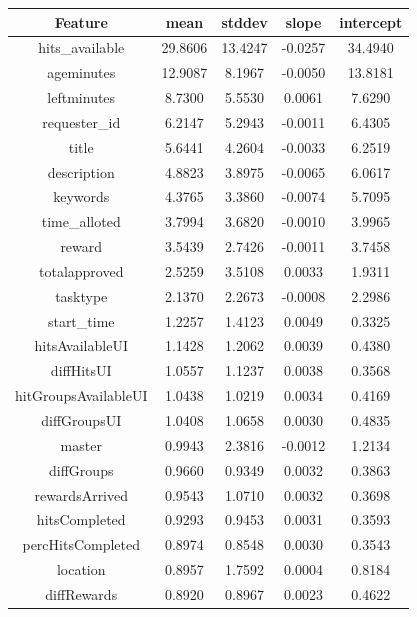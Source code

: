 \begin{table}[ht]
\scriptsize
\begin{tabular}{|c|c|c|c|c|}
\hline
Feature              & mean      & stddev    & slope     & intercept \\
\hline
hits\_available      & 29.8606 & 13.4247 & -0.0257 & 34.4940 \\
ageminutes           & 12.9087 &  8.1967 & -0.0050 & 13.8181 \\
leftminutes          &  8.7300 &  5.5530 & 0.0061 & 7.6290 \\
requester\_id        &  6.2147 &  5.2943 & -0.0011 & 6.4305 \\
title                &  5.6441 &  4.2604 & -0.0033 & 6.2519 \\
description          &  4.8823 &  3.8975 & -0.0065 & 6.0617 \\
keywords             &  4.3765 &  3.3860 & -0.0074 & 5.7095 \\
time\_alloted        &  3.7994 &  3.6820 & -0.0010 & 3.9965 \\
reward               &  3.5439 &  2.7426 & -0.0011 & 3.7458 \\
totalapproved        &  2.5259 &  3.5108 & 0.0033 & 1.9311 \\
tasktype             &  2.1370 &  2.2673 & -0.0008 & 2.2986 \\
start\_time          &  1.2257 &  1.4123 & 0.0049 & 0.3325 \\
hitsAvailableUI      &  1.1428 &  1.2062 & 0.0039 & 0.4380 \\
diffHitsUI           &  1.0557 &  1.1237 & 0.0038 & 0.3568 \\
hitGroupsAvailableUI &  1.0438 &  1.0219 & 0.0034 & 0.4169 \\
diffGroupsUI         &  1.0408 &  1.0658 & 0.0030 & 0.4835 \\
master               &  0.9943 &  2.3816 & -0.0012 & 1.2134 \\
diffGroups           &  0.9660 &  0.9349 & 0.0032 & 0.3863 \\
rewardsArrived       &  0.9543 &  1.0710 & 0.0032 & 0.3698 \\
hitsCompleted        &  0.9293 &  0.9453 & 0.0031 & 0.3593 \\
percHitsCompleted    &  0.8974 &  0.8548 & 0.0030 & 0.3543 \\
location             &  0.8957 &  1.7592 & 0.0004 & 0.8184 \\
diffRewards          &  0.8920 &  0.8967 & 0.0023 & 0.4622 \\

\end{tabular}
\end{table}
